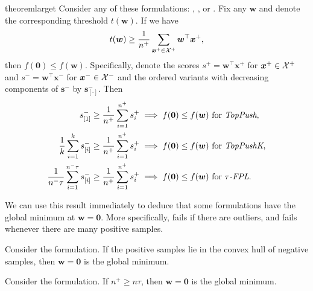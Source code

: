 \begin{restatable}{theorem}{larget}\label{thm:large_t}
  Consider any of these formulations: \TopPush, \TopPushK, \TopMeanK or \tauFPL. Fix any $\bm{w}$ and denote the corresponding threshold $t(\bm{w})$. If we have
  \begin{equation}\label{eq:w_zero_nn}
    t(\bm{w})\ge \frac{1}{n^+} \sum_{\bm{x}^+ \in \mathcal{X}^+} \bm{w}^\top \bm{x}^+,
  \end{equation}
  then $f(\bm{0})\le f(\bm{w})$. Specifically, denote the scores $s^+=\bm{w}^\top \bm{x}^+$ for $\bm{x}^+\in \mathcal{X}^+$ and $s^-=\bm{w}^\top \bm{x}^-$ for $\bm{x}^-\in \mathcal{X}^-$ and the ordered variants with decreasing components of $\bm{s}^-$ by $\bm{s}_{[\cdot]}^-$. Then
  \begin{equation}\label{eq:w_zero}
    \begin{aligned}
    s_{[1]}^- \ge \frac{1}{n^+} \sum_{i=1}^{n^+} s_{i}^+
    & \implies f(\bm{0}) \le f(\bm{w}) \text{ for } \emph{TopPush}, \\
    \frac{1}{k}\sum_{i=1}^k s_{[i]}^- \ge \frac{1}{n^+} \sum_{i=1}^{n^+} s_{i}^+
    & \implies f(\bm{0})\le f(\bm{w}) \text{ for } \emph{TopPushK}, \\
    \frac{1}{n^-\tau} \sum_{i=1}^{n^-\tau} s_{[i]}^- \ge \frac{1}{n^+}\sum_{i=1}^{n^+} s_{i}^+
    & \implies f(\bm{0}) \le f(\bm{w}) \text{ for } {\emph{$\tau$-FPL}}. \\
    \end{aligned}
  \end{equation}
\end{restatable}

We can use this result immediately to deduce that some formulations have the global minimum at $\bm{w} = \bm{0}$. More specifically, \TopPush fails if there are outliers, and \TopMeanK fails whenever there are many positive samples.

\begin{corollary}\label{cor:toppush}
  Consider the \TopPush formulation. If the positive samples lie in the convex hull of negative samples, then $\bm{w}=\bm{0}$ is the global minimum.
\end{corollary}

\begin{corollary}\label{cor:topmean}
  Consider the \TopMeanK formulation. If $n^+\ge n\tau$, then $\bm{w}=\bm{0}$ is the global minimum.
\end{corollary}

